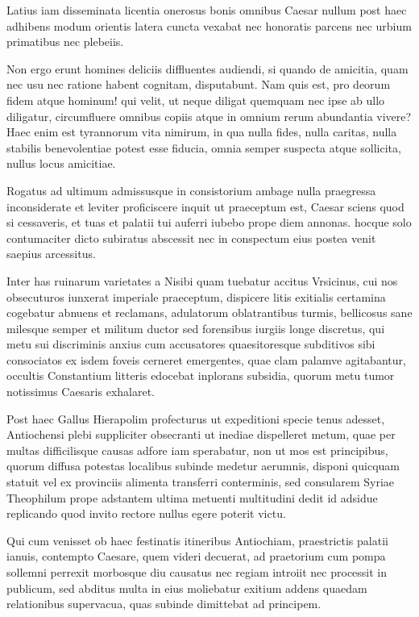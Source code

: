 \documentclass[12pt]{article}
\begin{document}
Latius iam disseminata licentia onerosus bonis omnibus Caesar nullum post haec adhibens modum orientis latera cuncta vexabat nec honoratis parcens nec urbium primatibus nec plebeiis.

Non ergo erunt homines deliciis diffluentes audiendi, si quando de amicitia, quam nec usu nec ratione habent cognitam, disputabunt. Nam quis est, pro deorum fidem atque hominum! qui velit, ut neque diligat quemquam nec ipse ab ullo diligatur, circumfluere omnibus copiis atque in omnium rerum abundantia vivere? Haec enim est tyrannorum vita nimirum, in qua nulla fides, nulla caritas, nulla stabilis benevolentiae potest esse fiducia, omnia semper suspecta atque sollicita, nullus locus amicitiae.

Rogatus ad ultimum admissusque in consistorium ambage nulla praegressa inconsiderate et leviter proficiscere inquit ut praeceptum est, Caesar sciens quod si cessaveris, et tuas et palatii tui auferri iubebo prope diem annonas. hocque solo contumaciter dicto subiratus abscessit nec in conspectum eius postea venit saepius arcessitus.

Inter has ruinarum varietates a Nisibi quam tuebatur accitus Vrsicinus, cui nos obsecuturos iunxerat imperiale praeceptum, dispicere litis exitialis certamina cogebatur abnuens et reclamans, adulatorum oblatrantibus turmis, bellicosus sane milesque semper et militum ductor sed forensibus iurgiis longe discretus, qui metu sui discriminis anxius cum accusatores quaesitoresque subditivos sibi consociatos ex isdem foveis cerneret emergentes, quae clam palamve agitabantur, occultis Constantium litteris edocebat inplorans subsidia, quorum metu tumor notissimus Caesaris exhalaret.

Post haec Gallus Hierapolim profecturus ut expeditioni specie tenus adesset, Antiochensi plebi suppliciter obsecranti ut inediae dispelleret metum, quae per multas difficilisque causas adfore iam sperabatur, non ut mos est principibus, quorum diffusa potestas localibus subinde medetur aerumnis, disponi quicquam statuit vel ex provinciis alimenta transferri conterminis, sed consularem Syriae Theophilum prope adstantem ultima metuenti multitudini dedit id adsidue replicando quod invito rectore nullus egere poterit victu.

Qui cum venisset ob haec festinatis itineribus Antiochiam, praestrictis palatii ianuis, contempto Caesare, quem videri decuerat, ad praetorium cum pompa sollemni perrexit morbosque diu causatus nec regiam introiit nec processit in publicum, sed abditus multa in eius moliebatur exitium addens quaedam relationibus supervacua, quas subinde dimittebat ad principem.
\end{document}

